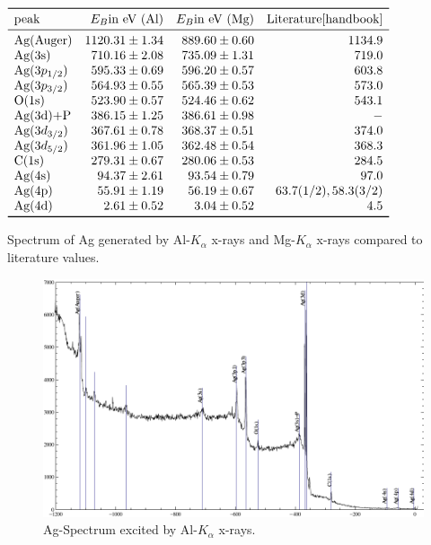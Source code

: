 \documentclass[a4paper]{scrartcl}
\numberwithin{equation}{section}
\numberwithin{figure}{section}
\numberwithin{table}{section}
\begin{document}
\begin{table}
$
\begin{array}{lrrr}
\toprule
\text{peak} & E_B \text{in eV (Al)}  &  E_B \text{in eV (Mg)} & \text{Literature} \cite{handbook} \\
\midrule
\text{Ag(Auger)} &  1120.31 \pm 1.34 &  889.60 \pm 0.60 & 1134.9\\
\text{Ag(3s)} &  710.16 \pm 2.08 &  735.09 \pm 1.31 &719.0\\
\text{Ag}(3p_{1/2}) & 595.33 \pm 0.69 &   596.20 \pm 0.57 &603.8 \\
\text{Ag}(3p_{3/2}) & 564.93 \pm 0.55 &   565.39 \pm 0.53  & 573.0\\
\text{O(1s)} & 523.90 \pm 0.57 &  524.46 \pm 0.62 &  543.1 \\
 \text{Ag(3d)+P} & 386.15 \pm 1.25 & 386.61 \pm 0.98  &-\\
\text{Ag}(3d_{3/2}) & 367.61 \pm 0.78 &  368.37 \pm 0.51 & 374.0 \\
\text{Ag} (3d_{5/2}) &  361.96 \pm 1.05 & 362.48 \pm 0.54 & 368.3 \\
 \text{C(1s)} & 279.31 \pm 0.67 &  280.06 \pm 0.53 & 284.5 \\
\text{Ag(4s)} & 94.37 \pm 2.61 &  93.54 \pm 0.79 & 97.0 \\
\text{Ag(4p)} & 55.91 \pm 1.19 & 56.19 \pm 0.67  & 63.7 (1/2), 58.3 (3/2) \\
 \text{Ag(4d)} & 2.61 \pm 0.52 &  3.04 \pm 0.52 & 4.5 \\
 \bottomrule
\end{array}
$
\caption{
\small Spectrum of Ag generated by Al-$K_\alpha$ x-rays and Mg-$K_\alpha$ x-rays compared to literature values.   } 
	\label{fig:tabelle}
\end{table}


\begin{figure}
  \centering
   	\includegraphics[width=\linewidth]{img/agal2.pdf}
 \caption{\small Ag-Spectrum excited by Al-$K_\alpha$ x-rays.  }
        \label{fig:agal}
\end{figure}
\end{document}
